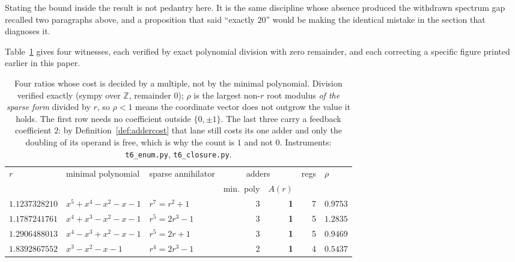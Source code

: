 \documentclass[11pt]{article}
\theoremstyle{definition}
\begin{document}
Stating the bound inside the result is not pedantry here. It is the same
discipline whose absence produced the withdrawn spectrum gap recalled two
paragraphs above, and a proposition that said ``exactly $20$'' would be making
the identical mistake in the section that diagnoses it.

Table~\ref{tab:sparsemult} gives four witnesses, each verified by exact
polynomial division with zero remainder, and each correcting a specific figure
printed earlier in this paper.

\begin{table}[t]\centering
\caption{Four ratios whose cost is decided by a multiple, not by the minimal
polynomial. Division verified exactly (sympy over $\mathbb{Z}$, remainder $0$);
$\rho$ is the largest non-$r$ root modulus \emph{of the sparse form} divided by
$r$, so $\rho<1$ means the coordinate vector does not outgrow the value it
holds. The first row needs no coefficient outside $\{0,\pm1\}$. The last three
carry a feedback coefficient $2$: by Definition~\ref{def:addercost} that lane
still costs its one adder and only the doubling of its operand is free, which is
why the count is $1$ and not $0$. Instruments: \texttt{t6\_enum.py},
\texttt{t6\_closure.py}.}
\label{tab:sparsemult}
\begin{tabular}{lllrrrl}
\toprule
$r$ & minimal polynomial & sparse annihilator & \multicolumn{2}{c}{adders}
    & regs & $\rho$ \\
\cmidrule(lr){4-5}
    &                    &                    & min.\ poly & $A(r)$ &  & \\
\midrule
$1.1237328210$ & $x^5{+}x^4{-}x^2{-}x{-}1$ & $r^7=r^2+1$      & 3 & \textbf{1} & 7 & $0.9753$ \\
$1.1787241761$ & $x^4{+}x^3{-}x^2{-}x{-}1$ & $r^5=2r^3-1$     & 3 & \textbf{1} & 5 & $1.2835$ \\
$1.2906488013$ & $x^4{-}x^3{+}x^2{-}x{-}1$ & $r^5=2r+1$       & 3 & \textbf{1} & 5 & $0.9469$ \\
$1.8392867552$ & $x^3{-}x^2{-}x{-}1$       & $r^4=2r^3-1$     & 2 & \textbf{1} & 4 & $0.5437$ \\
\bottomrule
\end{tabular}
\end{table}
\end{document}
